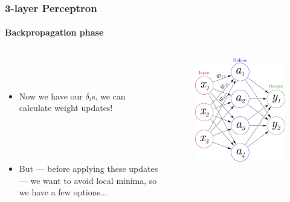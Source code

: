 \documentclass{beamer}
\newcommand{\figheight}{0.72\textheight}
\begin{document}
\begin{frame}[fragile]
\frametitle{3-layer Perceptron}
\framesubtitle{Backpropagation phase}
 \begin{columns}[T]
    \begin{column}{.45\textwidth} 
             \  \\
 \   \\   
     
     
\begin{itemize}

\item<1-> Now we have our $\delta_i$s, we can calculate weight updates!
 \begin{center}

\ \\

 
   
\end{center}



\ \\

 
 \item<6-> But --- before applying these updates --- we want to avoid local minima, so we have a few options...

 
\end{itemize}
\end{column}
\begin{column}{.55\textwidth}
\begin{figure}[t]
 \begin{flushleft}

 \includegraphics[height = \figheight]{./fig/3-layer_maths.pdf}


\end{flushleft}
\end{figure}
\end{column}
\end{columns}
\end{frame}
\end{document}
